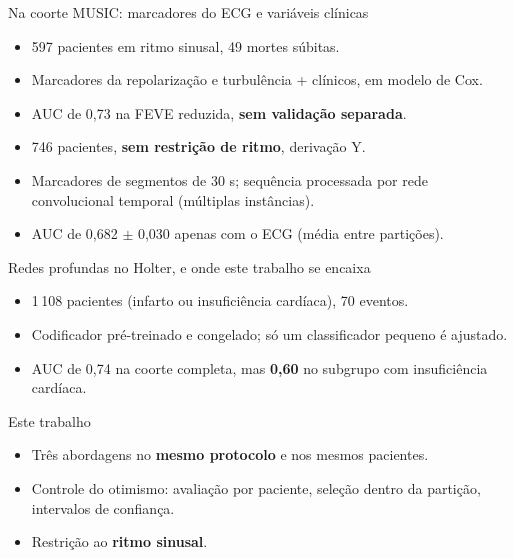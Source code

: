 \documentclass[10pt,aspectratio=169]{beamer}
\begin{document}
\begin{frame}{Na coorte MUSIC: marcadores do ECG e variáveis clínicas}
  \begin{block}{}
    \small
    \begin{itemize}
      \item 597 pacientes em ritmo sinusal, 49 mortes súbitas.
      \item Marcadores da repolarização e turbulência + clínicos, em modelo de Cox.
      \item AUC de 0,73 na FEVE reduzida, \textbf{sem validação separada}.
    \end{itemize}
  \end{block}
  \begin{block}{}
    \small
    \begin{itemize}
      \item 746 pacientes, \textbf{sem restrição de ritmo}, derivação Y.
      \item Marcadores de segmentos de 30 s; sequência processada por rede
        convolucional temporal (múltiplas instâncias).
      \item AUC de 0,682 $\pm$ 0,030 apenas com o ECG (média entre partições).
    \end{itemize}
  \end{block}
\end{frame}

\begin{frame}{Redes profundas no Holter, e onde este trabalho se encaixa}
  \begin{block}{}
    \small
    \begin{itemize}
      \item 1\,108 pacientes (infarto ou insuficiência cardíaca), 70 eventos.
      \item Codificador pré-treinado e congelado; só um classificador pequeno
        é ajustado.
      \item AUC de 0,74 na coorte completa, mas \textbf{0,60} no subgrupo com
        insuficiência cardíaca.
    \end{itemize}
  \end{block}
  \begin{block}{Este trabalho}
    \small
    \begin{itemize}
      \item Três abordagens no \textbf{mesmo protocolo} e nos mesmos pacientes.
      \item Controle do otimismo: avaliação por paciente, seleção dentro da
        partição, intervalos de confiança.
      \item Restrição ao \textbf{ritmo sinusal}.
    \end{itemize}
  \end{block}
\end{frame}
\end{document}
